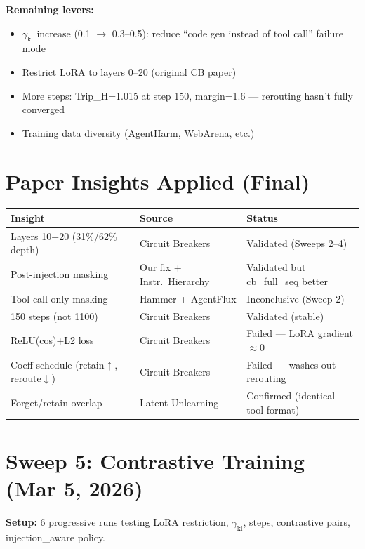 \documentclass[11pt]{article}
\newcommand{\good}[1]{\textcolor{good}{#1}}
\newcommand{\bad}[1]{\textcolor{bad}{#1}}
\begin{document}
\textbf{Remaining levers:}
\begin{itemize}
  \item $\gamma_\mathrm{kl}$ increase (0.1 $\to$ 0.3--0.5): reduce ``code gen instead of tool call'' failure mode
  \item Restrict LoRA to layers 0--20 (original CB paper)
  \item More steps: Trip\_H=1.015 at step 150, margin=1.6 --- rerouting hasn't fully converged
  \item Training data diversity (AgentHarm, WebArena, etc.)
\end{itemize}

\section{Paper Insights Applied (Final)}

\begin{tabular}{lll}
\toprule
Insight & Source & Status \\
\midrule
Layers 10+20 (31\%/62\% depth) & Circuit Breakers & \good{Validated (Sweeps 2--4)} \\
Post-injection masking & Our fix + Instr.\ Hierarchy & \good{Validated but cb\_full\_seq better} \\
Tool-call-only masking & Hammer + AgentFlux & Inconclusive (Sweep 2) \\
150 steps (not 1100) & Circuit Breakers & \good{Validated (stable)} \\
ReLU(cos)+L2 loss & Circuit Breakers & \bad{Failed --- LoRA gradient $\approx$0} \\
Coeff schedule (retain$\uparrow$, reroute$\downarrow$) & Circuit Breakers & \bad{Failed --- washes out rerouting} \\
Forget/retain overlap & Latent Unlearning & \bad{Confirmed (identical tool format)} \\
\bottomrule
\end{tabular}

\section{Sweep 5: Contrastive Training (Mar 5, 2026)}

\textbf{Setup:} 6 progressive runs testing LoRA restriction, $\gamma_\mathrm{kl}$, steps,
contrastive pairs, injection\_aware policy.
\end{document}

